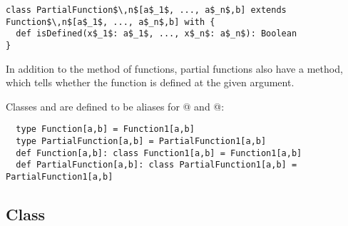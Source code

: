 \documentclass[11pt]{report}
\begin{document}
\begin{verbatim}
class PartialFunction$\,n$[a$_1$, ..., a$_n$,b] extends Function$\,n$[a$_1$, ..., a$_n$,b] with {
  def isDefined(x$_1$: a$_1$, ..., x$_n$: a$_n$): Boolean
}
\end{verbatim}

In addition to the \verb@apply@ method of functions, partial functions
also have a \verb@isDefined@ method, which tells whether the function
is defined at the given argument.

Classes \verb@Function@ and \verb@PartialFunction@ are defined to be aliases for
@ and @:
\begin{verbatim}
  type Function[a,b] = Function1[a,b]
  type PartialFunction[a,b] = PartialFunction1[a,b]
  def Function[a,b]: class Function1[a,b] = Function1[a,b]
  def PartialFunction[a,b]: class PartialFunction1[a,b] = PartialFunction1[a,b]
\end{verbatim}

\subsection{Class }\label{cls-list}
\end{document}
